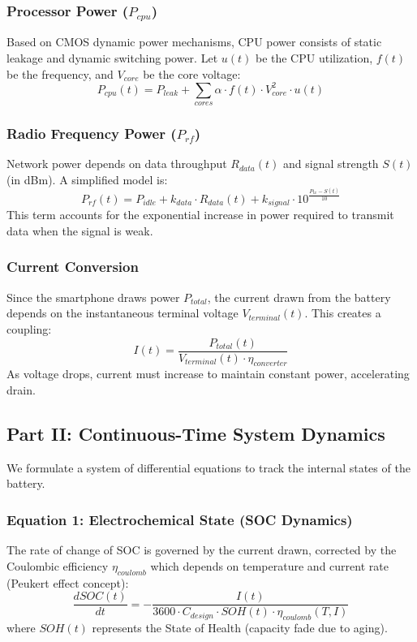 \documentclass[12pt]{article}
\begin{document}
\subsubsection{Processor Power ($P_{cpu}$)}
Based on CMOS dynamic power mechanisms, CPU power consists of static leakage and dynamic switching power. Let $u(t)$ be the CPU utilization, $f(t)$ be the frequency, and $V_{core}$ be the core voltage:
\begin{equation}
    P_{cpu}(t) = P_{leak} + \sum_{cores} \alpha \cdot f(t) \cdot V_{core}^2 \cdot u(t)
\end{equation}

\subsubsection{Radio Frequency Power ($P_{rf}$)}
Network power depends on data throughput $R_{data}(t)$ and signal strength $S(t)$ (in dBm). A simplified model is:
\begin{equation}
    P_{rf}(t) = P_{idle} + k_{data} \cdot R_{data}(t) + k_{signal} \cdot 10^{\frac{P_{tx}-S(t)}{10}}
\end{equation}
This term accounts for the exponential increase in power required to transmit data when the signal is weak.

\subsubsection{Current Conversion}
Since the smartphone draws power $P_{total}$, the current drawn from the battery depends on the instantaneous terminal voltage $V_{terminal}(t)$. This creates a coupling:
\begin{equation} \label{eq:current}
    I(t) = \frac{P_{total}(t)}{V_{terminal}(t) \cdot \eta_{converter}}
\end{equation}
As voltage drops, current must increase to maintain constant power, accelerating drain.

\subsection{Part II: Continuous-Time System Dynamics}
We formulate a system of differential equations to track the internal states of the battery.

\subsubsection{Equation 1: Electrochemical State (SOC Dynamics)}
The rate of change of SOC is governed by the current drawn, corrected by the Coulombic efficiency $\eta_{coulomb}$ which depends on temperature and current rate (Peukert effect concept):
\begin{equation} \label{eq:soc}
    \frac{dSOC(t)}{dt} = - \frac{I(t)}{3600 \cdot C_{design} \cdot SOH(t) \cdot \eta_{coulomb}(T, I)}
\end{equation}
where $SOH(t)$ represents the State of Health (capacity fade due to aging).
\end{document}
